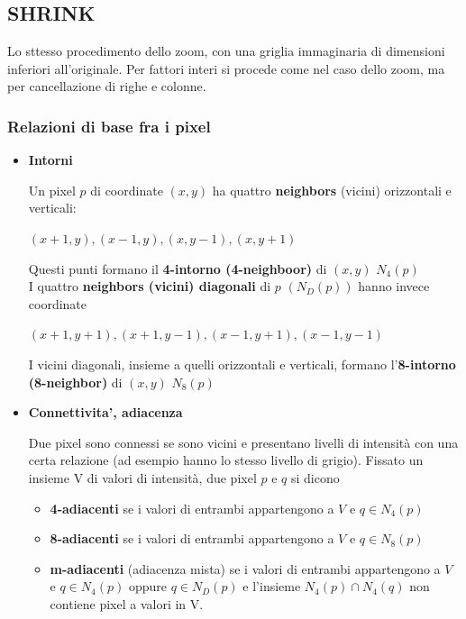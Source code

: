 \subsection{SHRINK}
Lo sttesso procedimento dello zoom, con una griglia immaginaria di dimensioni inferiori all'originale.
Per fattori interi si procede come nel caso dello zoom, ma per cancellazione di righe e colonne.

\subsubsection{Relazioni di base fra i pixel}

\begin{itemize}

    \item \textbf{Intorni}

          Un pixel $p$ di coordinate $(x,y)$ ha quattro \textbf{neighbors} (vicini) orizzontali e verticali:

          \begin{center}
              $(x+1, y), (x-1, y), (x, y-1), (x, y+1)$
          \end{center}

          Questi punti formano il \textbf{4-intorno (4-neighboor)} di $(x,y)$ $N_4(p)$
          \\I quattro \textbf{neighbors (vicini) diagonali} di $p$ $(N_D(p))$ hanno invece coordinate

          \begin{center}
              $(x+1, y+1), (x+1,y-1), (x-1, y+1), (x-1, y-1)$
          \end{center}

          I vicini diagonali, insieme a quelli orizzontali e verticali, formano l'\textbf{8-intorno (8-neighbor)} di $(x,y)$ $N_8(p)$

    \item \textbf{Connettivita', adiacenza}

          Due pixel sono connessi se sono vicini e presentano livelli di intensità con una certa relazione (ad esempio hanno lo stesso livello di grigio).
          Fissato un insieme V di valori di intensità, due pixel $p$ e $q$ si dicono

          \begin{itemize}
              \item \textbf{4-adiacenti} se i valori di entrambi appartengono a $V$ e $q \in N_4(p)$
              \item \textbf{8-adiacenti} se i valori di entrambi appartengono a $V$ e $q \in N_8(p)$
              \item \textbf{m-adiacenti} (adiacenza mista) se i valori di entrambi appartengono a $V$ e $q \in N_4(p)$ oppure $q \in N_D(p)$ e l'insieme $N_4(p) \cap N_4(q)$ non contiene pixel a valori in V.
          \end{itemize}


\end{itemize}
